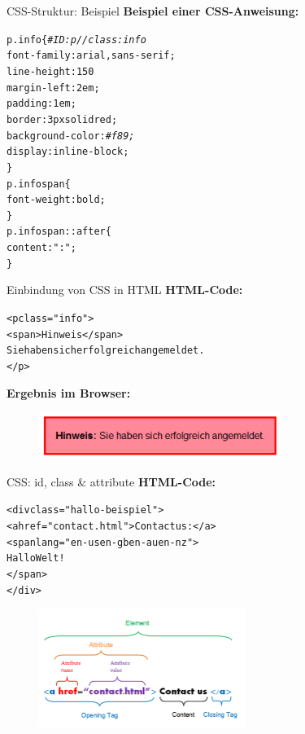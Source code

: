 \documentclass[xcolor=dvipsnames]{beamer}\usepackage[]{graphicx}\usepackage[]{color}
\makeatletter
\newcommand{\hlstr}[1]{\textcolor[rgb]{0.192,0.494,0.8}{#1}}%
\newcommand{\hlcom}[1]{\textcolor[rgb]{0.678,0.584,0.686}{\textit{#1}}}%
\newenvironment{kframe}{%
 \def\at@end@of@kframe{}%
 \ifinner\ifhmode%
  \def\at@end@of@kframe{\end{minipage}}%
  \begin{minipage}{\columnwidth}%
 \fi\fi%
 \def\FrameCommand##1{\hskip\@totalleftmargin \hskip-\fboxsep
 \colorbox{shadecolor}{##1}\hskip-\fboxsep
     \hskip-\linewidth \hskip-\@totalleftmargin \hskip\columnwidth}%
 \MakeFramed {\advance\hsize-\width
   \@totalleftmargin\z@ \linewidth\hsize
   \@setminipage}}%
 {\par\unskip\endMakeFramed%
 \at@end@of@kframe}
\makeatother
\begin{document}
\begin{frame}[fragile]{CSS-Struktur: Beispiel}
\textbf{Beispiel einer CSS-Anweisung:}
\begin{kframe}
\begin{alltt}
p.info \{ \hlcom{#ID:p // class: info}
  font-family: arial, sans-serif;
  line-height: 150%
  margin-left: 2em;
  padding: 1em;
  border: 3px solid red;
  background-color: \hlcom{#f89;}
  display: inline-block;
\}
p.info span \{
  font-weight: bold;
\}
p.info span::after \{
  content: \hlstr{": "};
\}
\end{alltt}
\end{kframe}
\end{frame}


\begin{frame}[fragile]{Einbindung von CSS in HTML}
\textbf{HTML-Code:}
\begin{kframe}
\begin{alltt}
<p class=\hlstr{"info"}>
  <span>Hinweis</span>
  Sie haben sich erfolgreich angemeldet.
</p>
\end{alltt}
\end{kframe}
\textbf{Ergebnis im Browser:}  
  \begin{figure}
  	\centering
  	\includegraphics[width=0.7\textwidth]{figure/CSSinHTML.png}
  	\\
  \end{figure}
\end{frame}


\begin{frame}[fragile]{CSS: id, class \& attribute}
\textbf{HTML-Code:}
\begin{kframe}
\begin{alltt}
<div class=\hlstr{"hallo-beispiel"}>
    <a href=\hlstr{"contact.html"}>Contact us:</a>
    <span lang=\hlstr{"en-us en-gb en-au en-nz"}>
      Hallo Welt!
    </span>
</div>
\end{alltt}
\end{kframe}
  \begin{figure}
  	\centering
  	\includegraphics[width=0.6\textwidth]{figure/CSSStructure.png}
  	\\
  \end{figure}
\end{frame}
\end{document}
